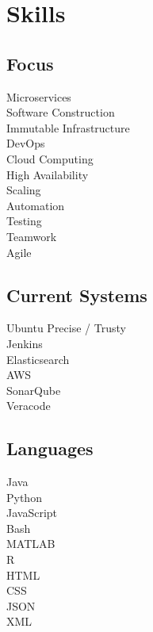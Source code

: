 \documentclass[letterpaper]{deedy-resume}
\begin{document}
\hfill
%
%
\begin{minipage}[t]{0.21\textwidth} 

\section{Skills}
\subsection{Focus}
Microservices \\
Software Construction \\
Immutable Infrastructure \\ 
DevOps \\
Cloud Computing \\
High Availability \\ 
Scaling \\ 
Automation \\  
Testing \\
Teamwork \\ 
Agile
\sectionspace

\subsection{Current Systems}
Ubuntu Precise / Trusty \\
Jenkins \\
Elasticsearch \\ 
AWS  \\
SonarQube \\
Veracode
\sectionspace

\subsection{Languages}
Java \\ Python \\ JavaScript \\ Bash \\ MATLAB \\ R \\ HTML \\ CSS \\ JSON \\ XML 
\sectionspace


\end{minipage}
\end{document}
